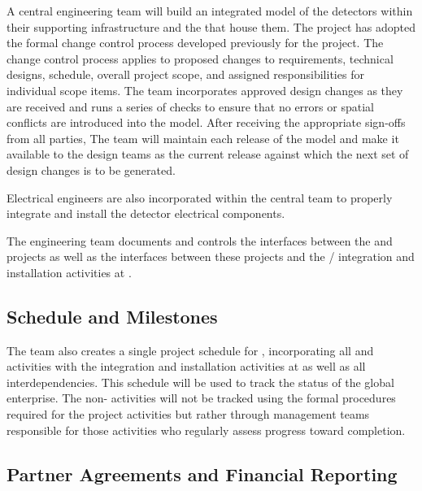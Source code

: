
A central  engineering team will build 
an integrated model of the detectors within their supporting
infrastructure and the  that house them.  
The  project has adopted 
the formal change control process developed previously for the 
 project.  The change control process applies to 
proposed changes to requirements, technical designs, 
schedule, overall project scope, and assigned responsibilities 
for individual scope items. 
The  team incorporates approved design changes as they 
are received and runs a series of checks to ensure that no errors 
or spatial conflicts are introduced into the model. After receiving the 
appropriate sign-offs from all parties, 
The  team will maintain  
each release  of the model and make it available to the 
design teams as the current release against which the next set 
of design changes is to be generated. 

Electrical engineers are also incorporated within the central
 team to properly integrate and install 
the detector electrical components.  

The   engineering team documents and
controls the interfaces between the  and  
projects as well as the interfaces between these projects and the 
/ integration and installation activities 
at .  


\subsection{Schedule and Milestones}
\label{sec:dune_schedule}

The  team also creates a single 
project schedule for , incorporating all 
 and  activities with the 
integration and installation activities at  
as well as all interdependencies.  This schedule will 
be used to track the status of the global enterprise.  
  The non- activities 
will not be tracked using the formal  procedures 
required for the  project activities but rather 
through management teams responsible for those activities who regularly assess progress toward completion.  


\subsection{Partner Agreements and Financial Reporting}
\label{sec:dune_agreements}

